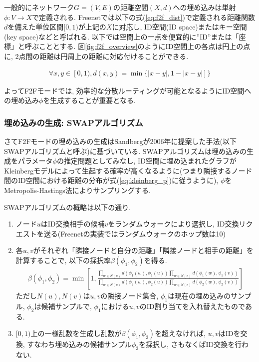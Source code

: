 \documentclass[dvipdfmx]{ampbt}
\begin{document}
   一般的にネットワーク$G=(V,E)$の距離空間$(X,d)$への埋め込みは単射$\phi:V \to X$で定義される\cite{papadimitriou2005conjecture}. Freenetでは以下の式(\ref{eq:f2f_dist})で定義される距離関数$d$を備えた単位区間$[0,1)$が上記の$X$に対応し, ID空間(ID space)またはキー空間(key space)などと呼ばれる. 以下では空間上の一点を便宜的に''ID''または「座標」と呼ぶこととする. 図\ref{fig:f2f_overview}のようにID空間上の各点は円上の点に, 2点間の距離は円周上の距離に対応付けることができる.

   \begin{eqnarray}
    \forall x,y \in [0,1), d(x,y) = \min\{|x-y|, 1 - |x-y|]\} \label{eq:f2f_dist}
   \end{eqnarray}

   よってF2Fモードでは, 効率的な分散ルーティングが可能となるようにID空間への埋め込み$\phi$を生成することが重要となる. 

   \subsubsection{埋め込みの生成: SWAPアルゴリズム}
   さてF2Fモードの埋め込みの生成はSandbergが2006年に提案した手法(以下SWAPアルゴリズムと呼ぶ)に基づいている\cite{sandberg2006distributed}. SWAPアルゴリズムは埋め込みの生成をパラメータ$\phi$の推定問題としてみなし, ID空間に埋め込まれたグラフがKleinbergモデルによって生起する確率が高くなるように(つまり隣接するノード間のID空間における距離の分布が式(\ref{eq:kleinberg_p})に従うように), $\phi$をMetropolis-Hastings法によりサンプリングする.

   SWAPアルゴリズムの概略は以下の通り.
   \begin{enumerate}
    \item ノード$u$はID交換相手の候補$v$をランダムウォークにより選択し, ID交換リクエストを送る(Freenetの実装ではランダムウォークのホップ数は10)
    \item 各$u,v$がそれぞれ「隣接ノードと自分の距離」「隣接ノードと相手の距離」を計算することで, 以下の採択率$\beta(\phi_1, \phi_2)$を得る. 
    \begin{eqnarray}
     \beta(\phi_1, \phi_2)= \min \left[1, \frac{\prod_{w \in N(u)}d(\phi_1(w), \phi_1(u))\prod_{w \in N(v)}d(\phi_1(w), \phi_1(v))}{\prod_{w \in N(u)}d(\phi_2(w), \phi_2(u))\prod_{w \in N(v)}d(\phi_2(w), \phi_2(v))}\right] \label{eq:acceptance}
    \end{eqnarray}
	  ただし$N(u), N(v)$は$u,v$の隣接ノード集合, $\phi_1$は現在の埋め込みのサンプル, $\phi_2$は候補サンプルで, $\phi_1$における$u,v$のID割り当てを入れ替えたものである.
    \item $[0,1)$上の一様乱数を生成し乱数が$\beta(\phi_1, \phi_2)$を超えなければ, $u,v$はIDを交換, すなわち埋め込みの候補サンプル$\phi_2$を採択し, さもなくばID交換を行わない.
   \end{enumerate}
\end{document}

